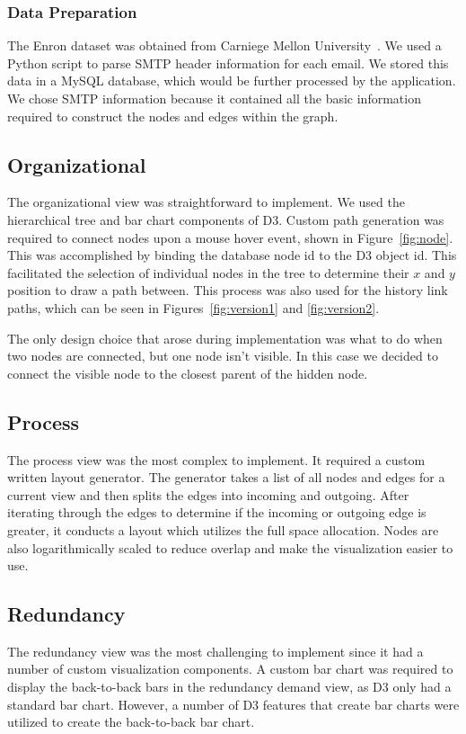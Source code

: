 \documentclass[journal]{vgtc}                %
\begin{document}
\subsubsection{Data Preparation}

The Enron dataset was obtained from Carniege Mellon University~\cite{cmuenron}.  We used a Python script to parse SMTP header information for each email.  We stored this data in a MySQL database, which would be further processed by the application. We chose SMTP information because it contained all the basic information required to construct the nodes and edges within the graph.

\subsection{Organizational}
The organizational view was straightforward to implement. We used the hierarchical tree and bar chart components of D3.  Custom path generation was required to connect nodes upon a mouse hover event, shown in Figure~\ref{fig:node}.  This was accomplished by binding the database node id to the D3 object id.  This facilitated the selection of individual nodes in the tree to determine their $x$ and $y$ position to draw a path between.  This process was also used for the history link paths, which can be seen in Figures~\ref{fig:version1} and \ref{fig:version2}.

The only design choice that arose during implementation was what to do when two nodes are connected, but one node isn't visible.  In this case we decided to connect the visible node to the closest parent of the hidden node.

\subsection{Process}
The process view was the most complex to implement.  It required a custom written layout generator.  The generator takes a list of all nodes and edges for a current view and then splits the edges into incoming and outgoing.  After iterating through the edges to determine if the incoming or outgoing edge is greater, it conducts a layout which utilizes the full space allocation.  Nodes are also logarithmically scaled to reduce overlap and make the visualization easier to use.

\subsection{Redundancy}
The redundancy view was the most challenging to implement since it had a number of custom visualization components.  A custom bar chart was required to display the back-to-back bars in the redundancy demand view, as D3 only had a standard bar chart.  However, a number of D3 features that create bar charts were utilized to create the back-to-back bar chart.
\end{document}

